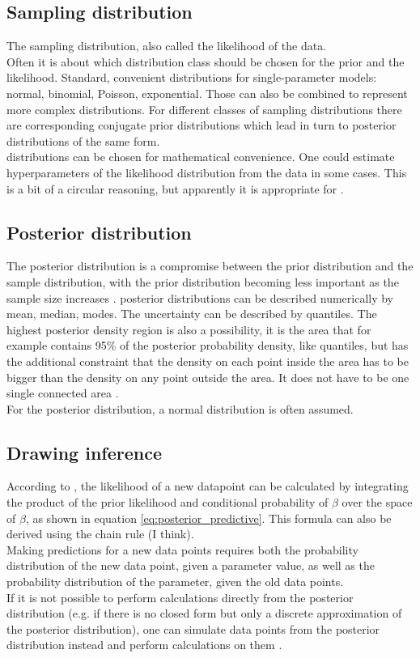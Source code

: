 \documentclass{article}
\begin{document}
\subsection{Sampling distribution}

The sampling distribution, also called the likelihood of the data.
\\
Often it is about which distribution class should be chosen for the prior and the likelihood. Standard, convenient distributions for single-parameter models: normal, binomial, Poisson, exponential. Those can also be combined to represent more complex distributions. For different classes of sampling distributions there are corresponding conjugate prior distributions which lead in turn to posterior distributions of the same form. \cite{1439840954}
\\
distributions can be chosen for mathematical convenience. One could estimate hyperparameters of the likelihood distribution from the data in some cases. This is a bit of a circular reasoning, but apparently  it is appropriate for \cite{1439840954}.

\subsection{Posterior distribution}

The posterior distribution is a compromise between the prior distribution and the sample distribution, with the prior distribution becoming less important as the sample size increases \cite{1439840954}.
posterior distributions can be described numerically by mean, median, modes. The uncertainty can be described by quantiles. The highest posterior density region is also a possibility, it is the area that for example contains 95\% of the posterior probability density, like quantiles, but has the additional constraint that the density on each point inside the area has to be bigger than the density on any point outside the area. It does not have to be one single connected area  \cite{1439840954}.
\\
For the posterior distribution, a normal distribution is often assumed.

\subsection{Drawing inference}
According to \cite{Wang2018}, the likelihood of a new datapoint can be calculated by integrating the product of the prior likelihood and conditional probability of $\beta$ over the space of $\beta$, as shown in equation \ref{eq:posterior_predictive}. This formula can also be derived using the chain rule (I think).
\\
Making predictions for a new data points requires both the probability distribution of the new data point, given a parameter value, as well as the probability distribution of the parameter, given the old data points.
\\
If it is not possible to perform calculations directly from the posterior distribution (e.g. if there is no closed form but only a discrete approximation of the posterior distribution), one can simulate data points from the posterior distribution instead and perform calculations on them \cite{1439840954}.
\end{document}
